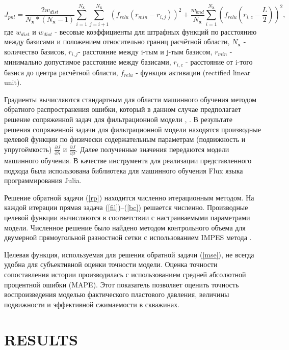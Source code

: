 \documentclass{article}
\begin{document}
\begin{equation*} \label{pnl}
	J_{pnl}=\frac{2w_{dist}}{N_\textbf{x}*(N_\textbf{x}-1)}\sum_{i=1}^{N_\textbf{x}}{\sum_{j=i+1 }^{N_\textbf{x}}{\left(f_{relu}\left(r_{min} - r_{i,j}\right)\right)^2}} + 
	\frac{w_{bnd}}{N_\textbf{x}}\sum_{i=1}^{N_\textbf{x}}{\left(f_{relu}\left(r_{i,c} - \frac{L}{2}\right)\right)^2},
\end{equation*}
где $w_{dist}$ и $w_{dist}$ - весовые коэффициенты для штрафных функций по расстоянию между базисами и положением относительно границ расчётной области, $N_\textbf{x}$ - количество базисов, $r_{i,j}$- расстояние между i-тым и j-тым базисом,  $r_{min}$ - минимально допустимое расстояние между базисами,  $r_{i,c}$ - расстояние от i-того базиса до центра расчётной области, $f_{relu}$ - функция активации (rectified linear unit).

	
Градиенты вычисляются стандартным для области машинного обучения методом обратного распространения ошибки, который в данном случае предполагает решение сопряженной задач для фильтрационной модели \cite{kos3}, \cite{far}. 
В результате решения сопряженной задачи для фильтрационной модели находятся производные целевой функции по физически содержательным параметрам (подвижность и упругоёмкость) $\frac{\partial J}{\partial \lambda}$ и $\frac{\partial J}{\partial \beta}$. Далее полученные значения передаются модели машинного обучения. В качестве инструмента для реализации представленного подхода была использована библиотека для машинного обучения Flux \cite{inn} языка программирования Julia.

Решение обратной задачи (\ref{rp}) находится численно
итерационным методом. На каждой итерации прямая задача
(\ref{fil})--(\ref{bc}) решается численно. Производные
целевой функции вычисляются в соответствии с настраиваемыми
параметрами модели. Численное решение было найдено
методом контрольного объема для двумерной прямоугольной
разностной сетки с использованием IMPES метода \cite{azi}.

Целевая функция, используемая для решения обратной задачи ({\ref{mse}}), не всегда удобна для субъективной оценки точности модели. Оценка точности сопоставления истории производилась с использованием средней абсолютной процентной ошибки (MAPE). Этот показатель позволяет оценить точность воспроизведения моделью фактического пластового давления, величины подвижности и эффективной сжимаемости в скважинах.


\section{RESULTS}
\end{document}
